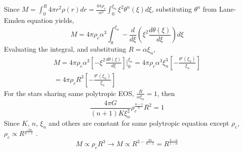 \documentclass[aps,twocolumn,showpacs,preprintnumbers,nofootinbib,prl,superscriptaddress,groupedaddress]{revtex4-2}
\begin{document}
Since $M = \int_0^R 4\pi r^2\rho(r)dr = \frac{4\pi \rho_c}{\alpha^3}\int_0^{\xi_n} \xi^2\theta^n(\xi)d\xi$, substituting $\theta^n$ from Lane-Emden equation yields,
$$M = 4\pi \rho_c\alpha^3\int_0^{\xi_n} -\frac{d}{d\xi}(\xi^2\frac{d\theta(\xi)}{d\xi})d\xi$$
Evaluating the integral, and substituting $R = \alpha\xi_n$,
\begin{align}
&	M = 4\pi \rho_c\alpha^3[-\xi^2\frac{d\theta(\xi)}{d\xi}]\bigg|_0^{\xi_n} = 4\pi \rho_c\alpha^3\xi^3_n[-\frac{\theta'(\xi_n)}{\xi_n}] & \\
	&= 4\pi \rho_cR^3[-\frac{\theta'(\xi_n)}{\xi_n}] & 
\end{align}
For the stars sharing same polytropic EOS, $\frac{R}{\alpha\xi_n}=1$, then
$$\frac{4\pi G}{(n+1)K \xi_n^2}\rho_c^{\frac{n-1}{n}}R^2 =1$$
Since $K$, $n$, $\xi_n$ and others are constant for same polytropic equation except $\rho_c$, $\rho_c \propto R^{\frac{-2n}{n-1}}$ . \\
$$M \propto \rho_cR^3 \to M \propto R^{3-\frac{2n}{n-1}}=R^{\frac{3-n}{1-n}}$$
\end{document}
